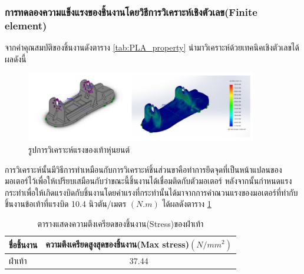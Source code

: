 \subsubsection*{การทดลองความแข็งแรงของชิ้นงานโดยวิธีการวิเคราะห์เชิงตัวเลข(Finite element)}
จากค่าคุณสมบัติของชิ้นงานดังตาราง \ref{tab:PLA_property} นำมาวิเคราะห์ด้วยเทคนิคเชิงตัวเลขได้ผลดังนี้
\begin{figure}[!ht]
  \centering
  \includegraphics[width=0.9\textwidth]{chapter4/images/FEA4.PNG}
  \caption{รูปการวิเคราะห์แรงของเท้าหุ่นยนต์}
  \label{fig:FEA4}
\end{figure}

การวิเคราะห์นั้นมีวิธีการทำเหมือนกับการวิเคราะห์ชิ้นส่วนขาคือทำการยึดจุดที่เป็นหน้าแปลนของมอเตอร์ไว้เพื่อให้เปรียบเสมือนกับว่าขณะนี้ชิ้นงานได้เชื่อมติดกับตัวมอเตอร์ 
หลังจากนั้นกำหนดแรงกระทำเพื่อให้เกิดแรงบิดกับชิ้นงานโดยค่าแรงที่กระทำนั้นได้มาจากการคำณวนแรงของมอเตอร์ที่ทำกับชิ้นงานข้อเท้าที่แรงบิด 10.4 นิวตัน/เมตร $(N.m)$
ได้ผลดังตาราง \ref{tab:footstress_result}

\begin{table}[!ht]
	\centering
	\begin{tabular}{| l | c |}
		\hline
		ชื่อชิ้นงาน	& ความตึงเครียดสูงสุดของชิ้นงาน(Max stress)$(N/mm^2)$ \\
        \hline
        ฝ่าเท้า & 37.44 \\
	    \hline
	\end{tabular}
	\caption{ตารางแสดงความตึงเครียดของชิ้นงาน(Stress)ของฝ่าเท้า}
	\label{tab:footstress_result}
\end{table}

\clearpage
